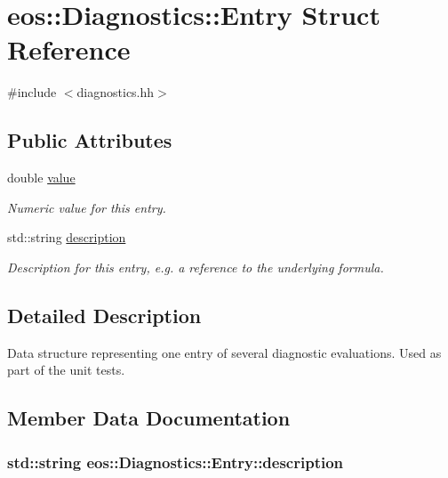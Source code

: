 \hypertarget{structeos_1_1Diagnostics_1_1Entry}{
\section{eos::Diagnostics::Entry Struct Reference}
\label{structeos_1_1Diagnostics_1_1Entry}
}


{\ttfamily \#include $<$diagnostics.hh$>$}\subsection*{Public Attributes}
\begin{DoxyCompactItemize}
\item 
double \hyperlink{structeos_1_1Diagnostics_1_1Entry_a979ae5967f4627300e5db3d5db042b26}{value}
\begin{DoxyCompactList}\small\item\em Numeric value for this entry. \item\end{DoxyCompactList}\item 
std::string \hyperlink{structeos_1_1Diagnostics_1_1Entry_af5b2da237c7151b5c45ca9fe627fbd86}{description}
\begin{DoxyCompactList}\small\item\em Description for this entry, e.g. a reference to the underlying formula. \item\end{DoxyCompactList}\end{DoxyCompactItemize}


\subsection{Detailed Description}
Data structure representing one entry of several diagnostic evaluations. Used as part of the unit tests. 

\subsection{Member Data Documentation}
\hypertarget{structeos_1_1Diagnostics_1_1Entry_af5b2da237c7151b5c45ca9fe627fbd86}{
\subsubsection[{description}]{\setlength{\rightskip}{0pt plus 5cm}std::string {\bf eos::Diagnostics::Entry::description}}}
\label{structeos_1_1Diagnostics_1_1Entry_af5b2da237c7151b5c45ca9fe627fbd86}


